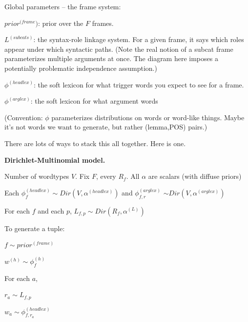 \documentclass[11pt,letterpaper]{article}
\newenvironment{itemizesquish}{\begin{list}{\labelitemi}{\setlength{\itemsep}{0em}\setlength{\labelwidth}{0.5em}\setlength{\leftmargin}{\labelwidth}\addtolength{\leftmargin}{\labelsep}}}{\end{list}}
\begin{document}
Global parameters -- the frame system:

\begin{itemizesquish}
  \item $prior^{(frame})$: prior over the $F$ frames.
  \item $L^{(subcats)}$: the syntax-role linkage system.  For a given frame, it says which roles appear under which syntactic paths.  (Note the real notion of a subcat frame parameterizes multiple arguments at once.  The diagram here imposes a potentially problematic independence assumption.)
  \item $\phi^{(headlex)}$: the soft lexicon for what trigger words you expect to see for a frame.

  \item $\phi^{(arglex)}$: the soft lexicon for what argument words
\end{itemizesquish}

(Convention: $\phi$ parameterizes distributions on words or word-like things.  
Maybe it's not words we want to generate, but rather (lemma,POS) pairs.)

There are lots of ways to stack this all together.  Here is one.

\textbf{Dirichlet-Multinomial model.}

Number of wordtypes $V$.  Fix $F$, every $R_f$.  All $\alpha$ are scalars (with diffuse priors)

\begin{itemizesquish}
  \item Each $\phi^{(headlex)}_f \sim Dir(V, \alpha^{(headlex)})$ and $\phi^{(arglex)}_{f,r}$ $\sim Dir(V, \alpha^{(arglex)})$
  \item For each $f$ and each $p$, $L_{f,p} \sim Dir(R_f, \alpha^{(L)})$
\end{itemizesquish}

To generate a tuple:

\begin{itemizesquish}
  \item $f \sim prior^{(frame)}$
  \item $w^{(h)} \sim \phi^{(h)}_f$
  \item For each $a$,
  \begin{itemizesquish}
    \item $r_a \sim L_{f,p}$
    \item $w_a \sim \phi^{(headlex)}_{f,r_a}$
  \end{itemizesquish}
\end{itemizesquish}
\end{document}

